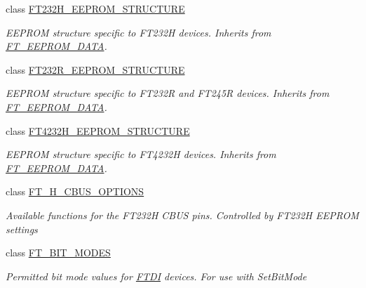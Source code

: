 \begin{DoxyCompactItemize}
class \mbox{\hyperlink{class_f_t_d2_x_x___n_e_t_1_1_f_t_d_i_1_1_f_t232_h___e_e_p_r_o_m___s_t_r_u_c_t_u_r_e}{F\+T232\+H\+\_\+\+E\+E\+P\+R\+O\+M\+\_\+\+S\+T\+R\+U\+C\+T\+U\+RE}}
\begin{DoxyCompactList}\small\item\em E\+E\+P\+R\+OM structure specific to F\+T232H devices. Inherits from \mbox{\hyperlink{class_f_t_d2_x_x___n_e_t_1_1_f_t_d_i_1_1_f_t___e_e_p_r_o_m___d_a_t_a}{F\+T\+\_\+\+E\+E\+P\+R\+O\+M\+\_\+\+D\+A\+TA}}. \end{DoxyCompactList}\item 
class \mbox{\hyperlink{class_f_t_d2_x_x___n_e_t_1_1_f_t_d_i_1_1_f_t232_r___e_e_p_r_o_m___s_t_r_u_c_t_u_r_e}{F\+T232\+R\+\_\+\+E\+E\+P\+R\+O\+M\+\_\+\+S\+T\+R\+U\+C\+T\+U\+RE}}
\begin{DoxyCompactList}\small\item\em E\+E\+P\+R\+OM structure specific to F\+T232R and F\+T245R devices. Inherits from \mbox{\hyperlink{class_f_t_d2_x_x___n_e_t_1_1_f_t_d_i_1_1_f_t___e_e_p_r_o_m___d_a_t_a}{F\+T\+\_\+\+E\+E\+P\+R\+O\+M\+\_\+\+D\+A\+TA}}. \end{DoxyCompactList}\item 
class \mbox{\hyperlink{class_f_t_d2_x_x___n_e_t_1_1_f_t_d_i_1_1_f_t4232_h___e_e_p_r_o_m___s_t_r_u_c_t_u_r_e}{F\+T4232\+H\+\_\+\+E\+E\+P\+R\+O\+M\+\_\+\+S\+T\+R\+U\+C\+T\+U\+RE}}
\begin{DoxyCompactList}\small\item\em E\+E\+P\+R\+OM structure specific to F\+T4232H devices. Inherits from \mbox{\hyperlink{class_f_t_d2_x_x___n_e_t_1_1_f_t_d_i_1_1_f_t___e_e_p_r_o_m___d_a_t_a}{F\+T\+\_\+\+E\+E\+P\+R\+O\+M\+\_\+\+D\+A\+TA}}. \end{DoxyCompactList}\item 
class \mbox{\hyperlink{class_f_t_d2_x_x___n_e_t_1_1_f_t_d_i_1_1_f_t__232_h___c_b_u_s___o_p_t_i_o_n_s}{F\+T\+\_\+H\+\_\+\+C\+B\+U\+S\+\_\+\+O\+P\+T\+I\+O\+NS}}
\begin{DoxyCompactList}\small\item\em Available functions for the F\+T232H C\+B\+US pins. Controlled by F\+T232H E\+E\+P\+R\+OM settings \end{DoxyCompactList}\item 
class \mbox{\hyperlink{class_f_t_d2_x_x___n_e_t_1_1_f_t_d_i_1_1_f_t___b_i_t___m_o_d_e_s}{F\+T\+\_\+\+B\+I\+T\+\_\+\+M\+O\+D\+ES}}
\begin{DoxyCompactList}\small\item\em Permitted bit mode values for \mbox{\hyperlink{class_f_t_d2_x_x___n_e_t_1_1_f_t_d_i}{F\+T\+DI}} devices. For use with Set\+Bit\+Mode \end{DoxyCompactList}\item 

\end{DoxyCompactItemize}
